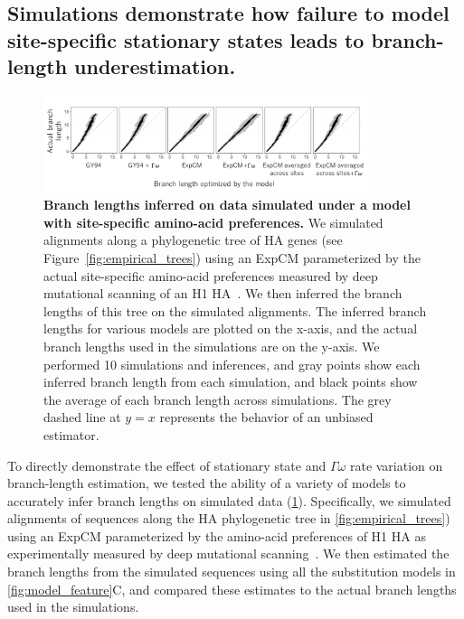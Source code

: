\documentclass[11pt]{article}
\begin{document}
\subsection*{Simulations demonstrate how failure to model site-specific stationary states leads to branch-length underestimation.}

\begin{figure}
\centerline{\includegraphics[width=0.85\textwidth]{figures/simulations}}
\caption{\label{fig:simulations}
\textbf{Branch lengths inferred on data simulated under a model with site-specific amino-acid preferences.} 
We simulated alignments along a phylogenetic tree of HA genes (see Figure~\ref{fig:empirical_trees}) using an ExpCM parameterized by the actual site-specific amino-acid preferences measured by deep mutational scanning of an H1 HA~\citep{doud2016accurate}.
We then inferred the branch lengths of this tree on the simulated alignments.
The inferred branch lengths for various models are plotted on the x-axis, and the actual branch lengths used in the simulations are on the y-axis.
We performed 10 simulations and inferences, and gray points show each inferred branch length from each simulation, and black points show the average of each branch length across simulations.
The grey dashed line at $y=x$ represents the behavior of an unbiased estimator. 
}
\end{figure}

To directly demonstrate the effect of stationary state and $\Gamma\omega$ rate variation on branch-length estimation, we tested the ability of a variety of models to accurately infer branch lengths on simulated data (\ref{fig:simulations}).
Specifically, we simulated alignments of sequences along the HA phylogenetic tree in \ref{fig:empirical_trees}) using an ExpCM parameterized by the amino-acid preferences of H1 HA as experimentally measured by deep mutational scanning~\citep{doud2016accurate}. We then estimated the branch lengths from the simulated sequences using all the substitution models in \ref{fig:model_feature}C, and compared these estimates to the actual branch lengths used in the simulations.
\end{document}
